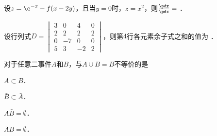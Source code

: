 \documentclass[plain,noanswer,medmath]{../../template/jnuexam}
\begin{document}








\begin{problem}
设$z = \e^{- x} - f(x - 2y)$，且当$y = 0$时，$z = x^2$，则$\frac{\pdz}{\pdx} =$ \fillin{}．
\end{problem}


\begin{problem}
设行列式$D = \begin{vmatrix}
  3 &  0 &  4 & 0 \\
  2 &  2 &  2 & 2 \\
  0 & -7 &  0 & 0 \\
  5 &  3 & -2 & 2
\end{vmatrix}$，则第$4$行各元素余子式之和的值为 \fillin{}．
\end{problem}














\begin{problem}
对于任意二事件$A$和$B$，与$A \cup B = B$不等价的是\pickout{}
\begin{abcd}
\item $A \subset B$．
\item $\bar B \subset \bar A$．
\item $A\bar B = \emptyset$．
\item $\bar AB = \emptyset$．
\end{abcd}
\end{problem}








\end{document}
